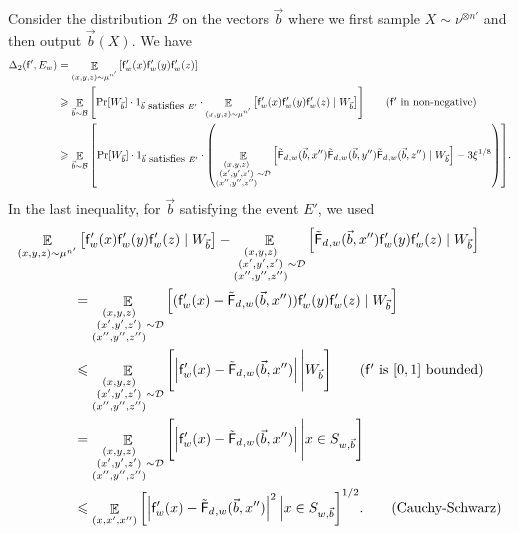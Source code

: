 \documentclass[10pt,a4paper]{amsart}
\newcommand\card[1]{\left| {#1} \right|}
\newcommand\Expect[2]{{\mathop{\mathbb{E}}_{#1}\left[ {#2} \right]}}
\renewcommand\geq{\geqslant}
\renewcommand\leq{\leqslant}
\newcommand{\V}[1]{{#1}}
\begin{document}
 Consider the distribution $\mathcal{B}$ on the vectors $\vec{b}$ where we first sample $X\sim \nu^{\otimes n'}$ and then output $\vec{b}(X)$. We have 
\begin{align*}
\Delta_2(\noisyfrefined, E_{\V w}) &= \Expect{\substack{(\V x, \V y, \V z)\sim \mu^{n'}}}{\noisyfrefined_{\V w}(\V x) \noisyfrefined_{\V w}(\V y) \noisyfrefined_{\V w}(\V z)}\\
& \geq\Expect{\vec{b}\sim \mathcal{B}}{\Pr[W_{\vec{b}}]\cdot 1_{\vec{b} ~\mbox{satisfies}~E'}\cdot \Expect{\substack{(\V x, \V y, \V z)\sim\mu^{n'}}}{\noisyfrefined_{\V w}(\V x) \noisyfrefined_{\V w}(\V y) \noisyfrefined_{\V w}(\V z) \mid W_{\vec{b}}} }\tag*{($\noisyfrefined$ in non-negative)}\\
& \geq\Expect{\vec{b}\sim \mathcal{B}}{\Pr[W_{\vec{b}}] \cdot 1_{\vec{b} ~\mbox{satisfies}~E'}\cdot\left( \Expect{\substack{(\V x, \V y, \V z)\\(\V x', \V y', \V z')\\ (\V x'', \V y'', \V z'')}\sim \mathcal{D}}{\truncfcoarsedecoupled_{,\V w}(\vec{b}, \V x'') \truncfcoarsedecoupled_{,\V w}(\vec{b}, \V y'') \truncfcoarsedecoupled_{,\V w}(\vec{b}, \V z'')  \mid W_{\vec{b}}} - 3\xi^{1/8}\right) }.
\end{align*}
In the last inequality, for $\vec{b}$ satisfying the event $E'$, we used
\begin{align*}
    &\Expect{(\V x, \V y, \V z)\sim \mu^{n'}}{\noisyfrefined_{\V w}(\V x) \noisyfrefined_{\V w}(\V y) \noisyfrefined_{\V w}(\V z) \mid W_{\vec{b}}} - \Expect{\substack{(\V x, \V y, \V z)\\(\V x', \V y', \V z')\\ (\V x'', \V y'', \V z'')}\sim \mathcal{D}}{{\truncfcoarsedecoupled_{,\V w}(\vec{b}, \V x'') \noisyfrefined_{\V w}(\V y) \noisyfrefined_{\V w}(\V z) \mid  W_{\vec{b}}} }\\
    &\quad\quad\quad\quad = \Expect{\substack{(\V x, \V y, \V z)\\(\V x', \V y', \V z')\\ (\V x'', \V y'', \V z'')}\sim \mathcal{D}}{(\noisyfrefined_{\V w}(\V x) - \truncfcoarsedecoupled_{,\V w}(\vec{b}, \V x''))\noisyfrefined_{\V w}(\V y) \noisyfrefined_{\V w}(\V z) \mid  W_{\vec{b}}}\\
    &\quad\quad\quad\quad \leq \Expect{\substack{(\V x, \V y, \V z)\\(\V x', \V y', \V z')\\ (\V x'', \V y'', \V z'')}\sim \mathcal{D}}{\card{\noisyfrefined_{\V w}(\V x) - \truncfcoarsedecoupled_{,\V w}(\vec{b}, \V x'')} \Bigg|  W_{\vec{b}}} \tag*{($\noisyfrefined$ is $[0,1]$ bounded)}\\
    &\quad\quad\quad\quad = \Expect{\substack{(\V x, \V y, \V z)\\(\V x', \V y', \V z')\\ (\V x'', \V y'', \V z'')}\sim \mathcal{D}}{\card{\noisyfrefined_{\V w}(\V x) - \truncfcoarsedecoupled_{,\V w}(\vec{b}, \V x'')} \Bigg|   x\in S_{\V w, \vec{b}}} \\
    &\quad\quad\quad\quad \leq \Expect{(\V x, \V x', \V x'')}{\card{\noisyfrefined_{\V w}(\V x) - \truncfcoarsedecoupled_{,\V w}(\vec{b}, \V x'')}^2 \Big| \V x\in S_{\V w, \vec{b}}}^{1/2}.\tag*{(Cauchy-Schwarz)}
\end{align*}
\end{document}
